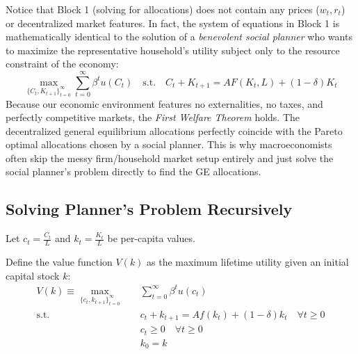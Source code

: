 Notice that Block 1 (solving for allocations) does not contain any prices ($w_t, r_t$) or decentralized market features. In fact, the system of equations in Block 1 is mathematically identical to the solution of a \textit{benevolent social planner} who wants to maximize the representative household's utility subject only to the resource constraint of the economy:
$$
\max_{\{C_t, K_{t+1}\}_{t=0}^\infty} \sum_{t=0}^\infty \beta^t u(C_t) \quad \text{s.t.} \quad C_t + K_{t+1} = AF(K_t, L) + (1-\delta)K_t
$$
Because our economic environment features no externalities, no taxes, and perfectly competitive markets, the \textit{First Welfare Theorem} holds. The decentralized general equilibrium allocations perfectly coincide with the Pareto optimal allocations chosen by a social planner. This is why macroeconomists often skip the messy firm/household market setup entirely and just solve the social planner's problem directly to find the GE allocations.


\subsection{Solving Planner's Problem Recursively}

Let $c_t = \frac{C_t}{L}$ and $k_t = \frac{K_t}{L}$ be per-capita values.

Define the value function $V(k)$ as the maximum lifetime utility given an initial capital stock $k$:
\begin{align*}
    V(k) \equiv \max_{\{c_t, k_{t+1}\}_{t=0}^\infty} \quad & \sum_{t=0}^\infty \beta^t u(c_t) \\
    \text{s.t.} \quad & c_t + k_{t+1} = A f(k_t) + (1-\delta)k_t \quad \forall t \ge 0 \\
    & c_t \ge 0 \quad \forall t \ge 0\\
    & k_0 = k
\end{align*}

